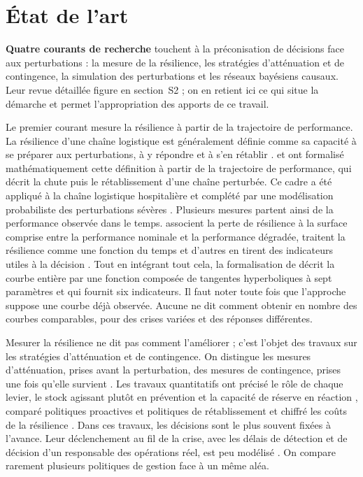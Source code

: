 \section{État de l'art}
\label{sec:etat}

\textbf{Quatre courants de recherche} touchent à la préconisation de décisions face aux perturbations : la mesure de la résilience, les stratégies d'atténuation et de contingence, la simulation des perturbations et les réseaux bayésiens causaux. Leur revue détaillée figure en section~S2 ; on en retient ici ce qui situe la démarche et permet l'appropriation des apports de ce travail.

Le premier courant mesure la résilience à partir de la trajectoire de performance. La résilience d'une chaîne logistique est généralement définie comme sa capacité à se préparer aux perturbations, à y répondre et à s'en rétablir \citep{tukamuhabwa2015, kamalahmadi2016}. \citet{rahiel2026in4pl} et \citet{rahiel2026these} ont formalisé mathématiquement cette définition à partir de la trajectoire de performance, qui décrit la chute puis le rétablissement d'une chaîne perturbée. Ce cadre a été appliqué à la chaîne logistique hospitalière \citep{rahiel2025esd} et complété par une modélisation probabiliste des perturbations sévères \citep{rahiel2026codit}. Plusieurs mesures partent ainsi de la performance observée dans le temps. \citet{bruneau2003} associent la perte de résilience à la surface comprise entre la performance nominale et la performance dégradée, \citet{henry2012} traitent la résilience comme une fonction du temps et d'autres en tirent des indicateurs utiles à la décision \citep{spiegler2012, behzadi2020}. Tout en intégrant tout cela, la formalisation de \citet{rahiel2026in4pl} décrit la courbe entière par une fonction composée de tangentes hyperboliques à sept paramètres et qui fournit six indicateurs. Il faut noter toute fois que l'approche suppose une courbe déjà observée. Aucune ne dit comment obtenir en nombre des courbes comparables, pour des crises variées et des réponses différentes. 

Mesurer la résilience ne dit pas comment l'améliorer ; c'est l'objet des travaux sur les stratégies d'atténuation et de contingence. On distingue les mesures d'atténuation, prises avant la perturbation, des mesures de contingence, prises une fois qu'elle survient \citep{tang2006, tomlin2006}. Les travaux quantitatifs ont précisé le rôle de chaque levier, le stock agissant plutôt en prévention et la capacité de réserve en réaction \citep{lucker2019}, comparé politiques proactives et politiques de rétablissement \citep{ivanov2016tre} et chiffré les coûts de la résilience \citep{aldrighetti2021}. Dans ces travaux, les décisions sont le plus souvent fixées à l'avance. Leur déclenchement au fil de la crise, avec les délais de détection et de décision d'un responsable des opérations réel, est peu modélisé \citep{klibi2012ijpe}. On compare rarement plusieurs politiques de gestion face à un même aléa.

